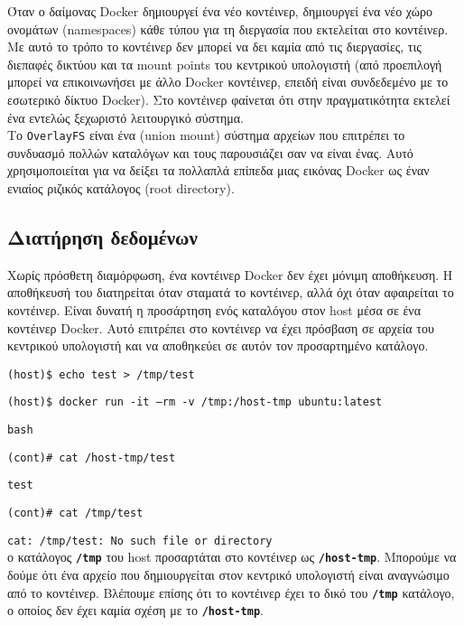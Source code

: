 Όταν ο δαίμονας \textlatin{Docker} δημιουργεί ένα νέο κοντέινερ, δημιουργεί ένα
νέο
χώρο ονομάτων (\textlatin{namespaces}) κάθε τύπου για τη διεργασία που
εκτελείται στο κοντέινερ. Με αυτό το τρόπο το κοντέινερ δεν μπορεί να δει καμία
από τις διεργασίες, τις διεπαφές δικτύου και τα \textlatin{mount points} του
κεντρικού υπολογιστή (από προεπιλογή μπορεί
να επικοινωνήσει με άλλο \textlatin{Docker} κοντέινερ, επειδή είναι συνδεδεμένο
με το εσωτερικό δίκτυο \textlatin{Docker}). Στο κοντέινερ φαίνεται ότι στην
πραγματικότητα εκτελεί ένα εντελώς ξεχωριστό λειτουργικό σύστημα. \\

Το \texttt{\textlatin{OverlayFS}} είναι ένα  (\textlatin{union mount}) σύστημα
αρχείων που επιτρέπει το συνδυασμό πολλών καταλόγων και τους παρουσιάζει σαν να
είναι ένας. Αυτό χρησιμοποιείται για να δείξει τα πολλαπλά επίπεδα μιας
εικόνας \textlatin{Docker} ως έναν ενιαίος ριζικός κατάλογος
(\textlatin{root directory}).

\subsection{Διατήρηση δεδομένων}

Χωρίς πρόσθετη διαμόρφωση, ένα κοντέινερ \textlatin{Docker} δεν έχει μόνιμη
αποθήκευση. Η αποθήκευσή του διατηρείται όταν σταματά το κοντέινερ, αλλά
όχι όταν αφαιρείται το κοντέινερ. Είναι δυνατή η προσάρτηση ενός καταλόγου
στον \textlatin{host} μέσα σε ένα κοντέινερ \textlatin{Docker}. Αυτό επιτρέπει
στο κοντέινερ να έχει πρόσβαση σε αρχεία του κεντρικού υπολογιστή και να
αποθηκεύει σε αυτόν τον προσαρτημένο κατάλογο.


\texttt{\textlatin{(host)\$ echo test > /tmp/test}}

\texttt{\textlatin{(host)\$ docker run -it --rm -v /tmp:/host-tmp ubuntu:latest}}

\texttt{\textlatin{bash}}

\texttt{\textlatin{(cont)\# cat /host-tmp/test}}

\texttt{\textlatin{test}}

\texttt{\textlatin{(cont)\# cat /tmp/test}}

\texttt{\textlatin{cat: /tmp/test: No such file or directory}} \\

ο κατάλογος \textbf{\texttt{\textlatin{/tmp}}} του \textlatin{host} προσαρτάται
στο κοντέινερ ως \textbf{\texttt{\textlatin{/host-tmp}}}. Μπορούμε να δούμε ότι
ένα αρχείο που δημιουργείται στον κεντρικό υπολογιστή είναι αναγνώσιμο από το
κοντέινερ. Βλέπουμε επίσης ότι το κοντέινερ έχει το δικό του
\textbf{\texttt{\textlatin{/tmp}}} κατάλογο, ο οποίος δεν έχει καμία σχέση με το
\textbf{\texttt{\textlatin{/host-tmp}}}.

